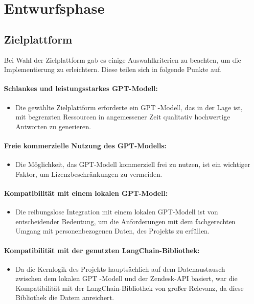 \section{Entwurfsphase} 
\label{sec:Entwurfsphase}

\subsection{Zielplattform}
\label{sec:Zielplattform}
Bei Wahl der Zielplattform gab es einige Auswahlkriterien zu beachten, um die Implementierung zu erleichtern.
Diese teilen sich in folgende Punkte auf.

\paragraph{Schlankes und leistungsstarkes \ac{GPT}-Modell:} 
\begin{itemize}
	\item Die gewählte Zielplattform erforderte ein \ac{GPT} -Modell, das in der Lage ist, mit begrenzten Ressourcen in angemessener Zeit qualitativ hochwertige Antworten zu generieren.
\end{itemize}

\paragraph{Freie kommerzielle Nutzung des \ac{GPT}-Modells:} 
\begin{itemize}
	\item Die Möglichkeit, das \ac{GPT}-Modell kommerziell frei zu nutzen, ist ein wichtiger Faktor, um Lizenzbeschränkungen zu vermeiden.
\end{itemize}

\paragraph{Kompatibilität mit einem lokalen \ac{GPT}-Modell:} 
\begin{itemize}
	\item Die reibungslose Integration mit einem lokalen \ac{GPT}-Modell ist von entscheidender Bedeutung, um die Anforderungen mit dem fachgerechten Umgang mit personenbezogenen Daten, des Projekts zu erfüllen.
\end{itemize}

\paragraph{Kompatibilität mit der genutzten LangChain-Bibliothek:} 
\begin{itemize}
	\item Da die Kernlogik des Projekts hauptsächlich auf dem Datenaustausch zwischen dem lokalen \ac{GPT} -Modell und der Zendesk-\ac{API} basiert, war die Kompatibilität mit der LangChain-Bibliothek von großer Relevanz, da diese Bibliothek die Datem anreichert.
\end{itemize}


